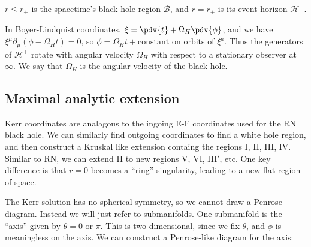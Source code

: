 \documentclass{jknotes}
\begin{document}
\(r\le r_+\) is the spacetime's black hole region \(\mathcal{B}\), and \(r=r_+\) is its event horizon \(\mathcal{H}^+\).

In Boyer-Lindquist coordinates, \(\xi=\pdv{t}+\Omega_H\pdv{\phi}\), and we have \(\xi^\mu\partial_\mu(\phi-\Omega_H t)=0\), so \(\phi= \Omega_H t + \text{constant}\) on orbits of \(\xi^a\). Thus the generators of \(\mathcal{H}^+\) rotate with angular velocity \(\Omega_H\) with respect to a stationary observer at \(\infty\). We say that \(\Omega_H\) is the angular velocity of the black hole.

\subsection{Maximal analytic extension}
Kerr coordinates are analagous to the ingoing E-F coordinates used for the RN black hole. We can similarly find outgoing coordinates to find a white hole region, and then construct a Kruskal like extension containg the regions I, II, III, IV. Similar to RN, we can extend II to new regions V, VI, III\({}'\), etc. One key difference is that \(r=0\) becomes a ``ring'' singularity, leading to a new flat region of space.

The Kerr solution has no spherical symmetry, so we cannot draw a Penrose diagram. Instead we will just refer to submanifolds. One submanifold is the ``axis'' given by \(\theta=0 \text{ or } \pi\). This is two dimensional, since we fix \(\theta\), and \(\phi\) is meaningless on the axis. We can construct a Penrose-like diagram for the axis:
\end{document}
